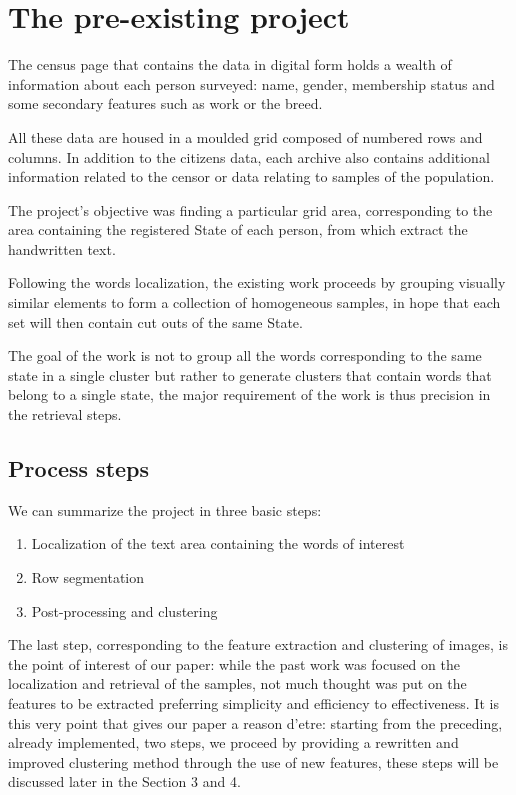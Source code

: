 \section{The pre-existing project}

The census page that contains the data in digital form holds a wealth of information about each person surveyed: name, gender, membership status and some secondary features such as work or the breed. 

All these data are housed in a moulded grid composed of numbered rows and columns. In addition to the citizens data, each archive also contains additional information related to the censor or data relating to samples of the population.

The project's objective was finding a particular grid area, corresponding to the area containing the registered State of each person, from which extract the handwritten text.

Following the words localization, the existing work proceeds by grouping visually similar elements to form a collection of homogeneous samples, in hope that each set will then contain cut outs of the same State.

The goal of the work is not to group all the words corresponding to the same state in a single cluster but rather to generate clusters that contain words that belong to a single state, the major requirement of the work is thus precision in the retrieval steps.

\subsection{Process steps}

We can summarize the project in three basic steps:
\begin{enumerate}
\item Localization of the text area containing the words of interest
\item Row segmentation
\item Post-processing and clustering
\end{enumerate}

The last step, corresponding to the feature extraction and clustering of images, is the point of interest of our paper: while the past work was focused on the localization and retrieval of the samples, not much thought was put on the features to be extracted preferring simplicity and efficiency to effectiveness.
It is this very point that gives our paper a reason d'etre: starting from the preceding, already implemented, two steps, we proceed by providing a rewritten and improved clustering method through the use of new features, these steps will be discussed later in the Section 3 and 4.

